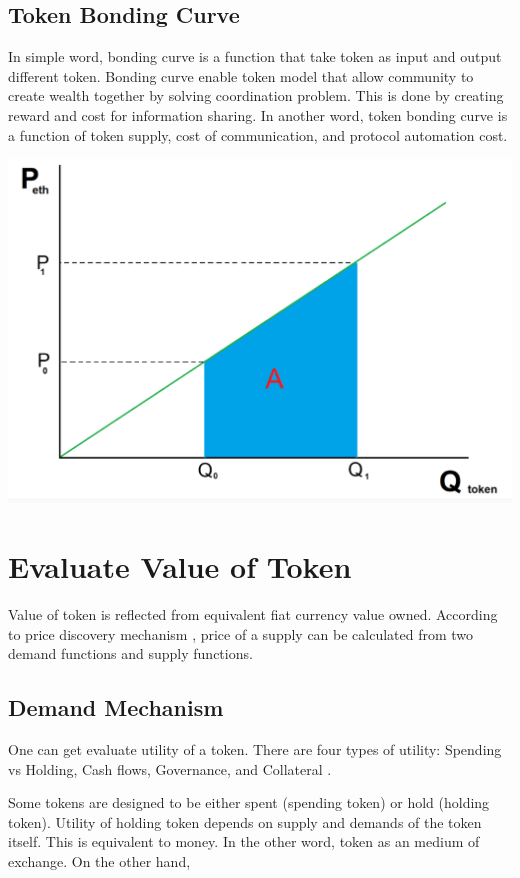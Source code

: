 \documentclass{IEEEtran}
\begin{document}
\subsection{Token Bonding Curve}
\label{sec:orgd16dae1}
In simple word, bonding curve is a function that take token as input and output different token. Bonding curve enable token model that allow community to create wealth together by solving coordination problem. This is done by creating reward and cost for information sharing. In another word, token bonding curve is a function of token supply, cost of communication, and protocol automation cost.

\begin{center}
\includegraphics[width=.9\linewidth]{./images/screenshot_20220504_233447.png}
\end{center}

\section{Evaluate Value of Token}
\label{sec:org3c77116}
Value of token is reflected from equivalent fiat currency value owned. According to price discovery mechanism \cite{walsh2017monetary}, price of a supply can be calculated from two demand functions and supply functions.
\subsection{Demand Mechanism}
\label{sec:org28ee683}
One can get evaluate utility of a token. There are four types of utility: Spending vs Holding, Cash flows, Governance, and Collateral \cite{eliason2022tokenomics}.

Some tokens are designed to be either spent (spending token) or hold (holding token).
Utility of holding token depends on supply and demands of the token itself. This is equivalent to money. In the other word, token as an medium of exchange. On the other hand,
\end{document}
